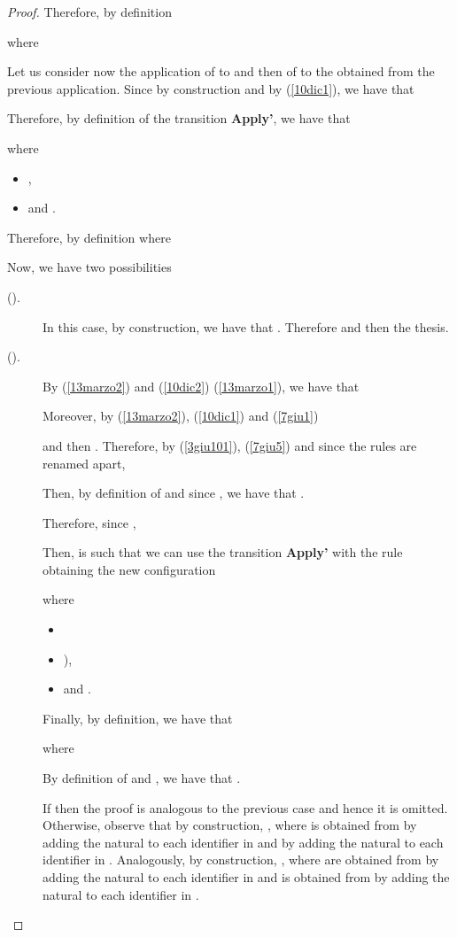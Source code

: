 \documentclass{tlp}
\begin{document}
\begin{proof}
    Therefore, by definition
    
    where
    

Let us consider now the application of
 to  and then of  to the  obtained from the previous application.
Since by construction  and by (\ref{10dic1}), we have that

Therefore, by definition of the transition \textbf{Apply'}, we have that

\noindent where
\begin{itemize}
  \item ,
  \item  and
.
\end{itemize}



Therefore, by definition 
  where


Now, we have two possibilities
\begin{description}
  \item[().] In this case, by construction, we have that . Therefore  and then the thesis.
  \item[().]
 By (\ref{13marzo2}) and (\ref{10dic2})
(\ref{13marzo1}), we have that


Moreover, by (\ref{13marzo2}), (\ref{10dic1}) and (\ref{7giu1})

and then .
Therefore, by (\ref{3giu101}), (\ref{7giu5}) and since the rules are renamed apart,

Then, by definition of  and since , we have that
.

Therefore, since  ,


Then,  is such that we can use the transition \textbf{Apply'} with the rule  obtaining the new configuration

where \begin{itemize}
        \item 
        \item ),
        \item  and .
      \end{itemize}

Finally, by definition, we have that

  where
  
  By definition of  and , we have that .

  If  then the proof is analogous to the previous case and hence it is omitted.
  Otherwise, observe that by construction,
, where
 is obtained from  by adding the natural  to each identifier in
 and by adding the natural  to each identifier in
.
Analogously, by construction,
, where
  are obtained from  by adding the natural  to each identifier in
 and  is obtained from  by adding the natural   to each identifier in .


\end{description}
\end{proof}
\end{document}
